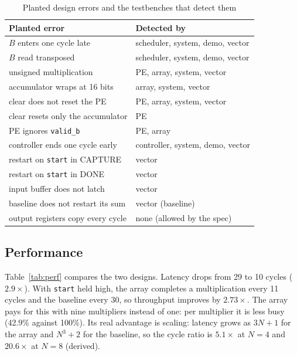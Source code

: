 \documentclass[conference]{IEEEtran}
\newcommand{\code}[1]{\texttt{#1}}
\begin{document}
\begin{table}[t]
\caption{Planted design errors and the testbenches that detect them}
\label{tab:mut}
\centering
\footnotesize
\begin{tabular}{@{}lp{}@{}}
\toprule
Planted error & Detected by \\
\midrule
$B$ enters one cycle late & scheduler, system, demo, vector \\
$B$ read transposed & scheduler, system, demo, vector \\
unsigned multiplication & PE, array, system, vector \\
accumulator wraps at 16 bits & array, system, vector \\
clear does not reset the PE & PE, array, system, vector \\
clear resets only the accumulator & PE \\
PE ignores \code{valid\_b} & PE, array \\
controller ends one cycle early & controller, system, demo, vector \\
restart on \code{start} in CAPTURE & vector \\
restart on \code{start} in DONE & vector \\
input buffer does not latch & vector \\
baseline does not restart its sum & vector (baseline) \\
output registers copy every cycle & none (allowed by the spec) \\
\bottomrule
\end{tabular}
\end{table}

\subsection{Performance}
Table~\ref{tab:perf} compares the two designs. Latency drops from 29 to 10 cycles ($2.9\times$). With \code{start} held high, the array completes a multiplication every 11 cycles and the baseline every 30, so throughput improves by $2.73\times$. The array pays for this with nine multipliers instead of one: per multiplier it is less busy (42.9\% against 100\%). Its real advantage is scaling: latency grows as $3N + 1$ for the array and $N^3 + 2$ for the baseline, so the cycle ratio is $5.1\times$ at $N = 4$ and $20.6\times$ at $N = 8$ (derived).
\end{document}
